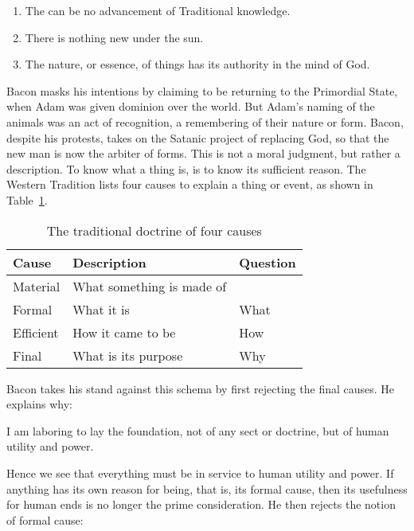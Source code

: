 \begin{enumerate}
\item The can be no advancement of Traditional knowledge. 
\item There is nothing new under the sun. 
\item The nature, or essence, of things has its authority in the mind of God. 
\end{enumerate}
Bacon masks his intentions by claiming to be returning to the Primordial State, when Adam was given dominion over the world. But Adam's naming of the animals was an act of recognition, a remembering of their nature or form. Bacon, despite his protests, takes on the Satanic project of replacing God, so that the new man is now the arbiter of forms. This is not a moral judgment, but rather a description. To know what a thing is, is to know its sufficient reason. The Western Tradition lists four causes to explain a thing or event, as shown in Table~\ref{tab:fourcauses}.

\begin{table}[h]
\small
\label{tab:fourcauses}
\centering
\begin{tabular}{lll}\toprule
\textbf{Cause} &
\textbf{Description} &
\textbf{Question}\\\toprule
Material &
What something is made of &
\\\midrule
Formal &
What it is &
What\\\midrule
Efficient &
How it came to be &
How\\\midrule
Final &
What is its purpose &
Why\\\bottomrule
\end{tabular}
\caption{The traditional doctrine of four causes}
\end{table}

Bacon takes his stand against this schema by first rejecting the final causes. He explains why:

\begin{quotex}
I am laboring to lay the foundation, not of any sect or doctrine, but of human utility and power. 

\end{quotex}
Hence we see that everything must be in service to human utility and power. If anything has its own reason for being, that is, its formal cause, then its usefulness for human ends is no longer the prime consideration. He then rejects the notion of formal cause:

